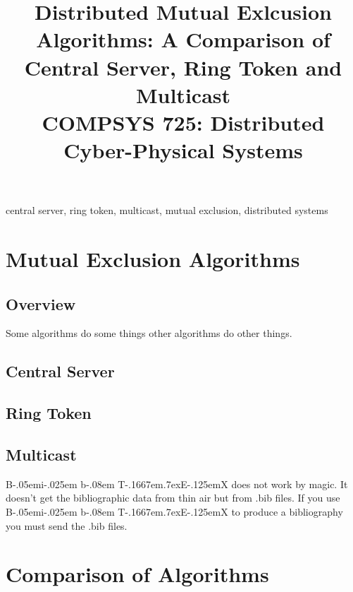 \documentclass[conference]{IEEEtran}
\def\BibTeX{{\rm B\kern-.05em{\sc i\kern-.025em b}\kern-.08em
    T\kern-.1667em\lower.7ex\hbox{E}\kern-.125emX}}
\begin{document}
\title{Distributed Mutual Exlcusion Algorithms: A Comparison of Central Server,
Ring Token and Multicast\\
{\footnotesize COMPSYS 725: Distributed Cyber-Physical Systems}
}

\author{
}

\maketitle


\begin{IEEEkeywords}
central server, ring token, multicast, mutual exclusion, distributed systems
\end{IEEEkeywords}

\section{Mutual Exclusion Algorithms}
\subsection{Overview}
Some algorithms do some things other algorithms do other things.
\subsection{Central Server}
\subsection{Ring Token}
\subsection{Multicast}

{\BibTeX} does not work by magic. It doesn't get the bibliographic
data from thin air but from .bib files. If you use {\BibTeX} to produce a
bibliography you must send the .bib files. 


\section{Comparison of Algorithms}
\end{document}
